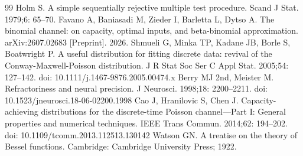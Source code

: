 \documentclass[10pt,letterpaper]{article}
\begin{document}
\begin{thebibliography}{99}
 Holm S. A simple sequentially rejective multiple test procedure. Scand J Stat. 1979;6: 65--70.
 Favano A, Baniasadi M, Zieder I, Barletta L, Dytso A. The binomial channel: on capacity, optimal inputs, and beta-binomial approximation. arXiv:2607.02683 [Preprint]. 2026.
 Shmueli G, Minka TP, Kadane JB, Borle S, Boatwright P. A useful distribution for fitting discrete data: revival of the Conway-Maxwell-Poisson distribution. J R Stat Soc Ser C Appl Stat. 2005;54: 127--142. doi: 10.1111/j.1467-9876.2005.00474.x
 Berry MJ 2nd, Meister M. Refractoriness and neural precision. J Neurosci. 1998;18: 2200--2211. doi: 10.1523/jneurosci.18-06-02200.1998
 Cao J, Hranilovic S, Chen J. Capacity-achieving distributions for the discrete-time Poisson channel---Part I: General properties and numerical techniques. IEEE Trans Commun. 2014;62: 194--202. doi: 10.1109/tcomm.2013.112513.130142
 Watson GN. A treatise on the theory of Bessel functions. Cambridge: Cambridge University Press; 1922.
\end{thebibliography}

\nolinenumbers
\end{document}
